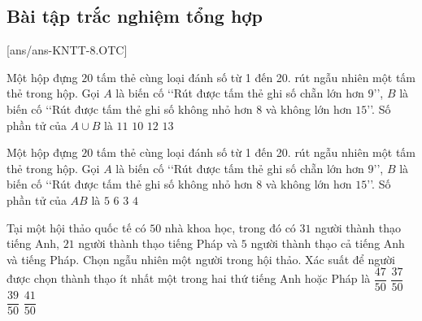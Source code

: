 \subsection{Bài tập trắc nghiệm tổng hợp}
[ans/ans-KNTT-8.OTC]
\begin{ex} %
	Một hộp đựng $20$ tấm thẻ cùng loại đánh số từ 1 đến 20. rút ngẫu nhiên một tấm thẻ trong hộp. Gọi $A$ là biến cố \lq\lq Rút được tấm thẻ ghi số chẵn lớn hơn $9$\rq\rq, $B$ là biến cố \lq\lq Rút được tấm thẻ ghi số không nhỏ hơn $8$ và không lớn hơn $15$\rq\rq. Số phần tử của $A\cup B$ là 
	\choice
	{\True$11$}
	{$10$}
	{$12$}
	{$13$}
\end{ex}
\begin{ex} %
	Một hộp đựng $20$ tấm thẻ cùng loại đánh số từ 1 đến 20. rút ngẫu nhiên một tấm thẻ trong hộp. Gọi $A$ là biến cố \lq\lq Rút được tấm thẻ ghi số chẵn lớn hơn $9$\rq\rq, $B$ là biến cố \lq\lq Rút được tấm thẻ ghi số không nhỏ hơn $8$ và không lớn hơn $15$\rq\rq. Số phần tử của $AB$ là
	\choice
	{$5$}
	{$6$}
	{\True$3$}
	{$4$}
\end{ex}
\begin{ex} %
	Tại một hội thảo quốc tế có $50$ nhà khoa học, trong đó có $31$ người thành thạo tiếng Anh, $21$ người thành thạo tiếng Pháp và $5$ người thành thạo cả tiếng Anh và tiếng Pháp. Chọn ngẫu nhiên một người trong hội thảo. Xác suất để người được chọn thành thạo ít nhất một trong hai thứ tiếng Anh hoặc Pháp là 
	\choice
	{\True$\dfrac{47}{50}$}
	{$\dfrac{37}{50}$}
	{$\dfrac{39}{50}$}
	{$\dfrac{41}{50}$}
\end{ex}
